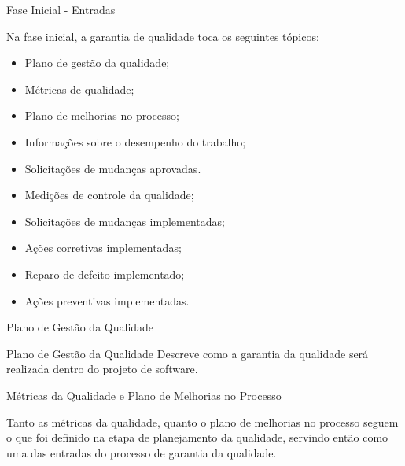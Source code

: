 \documentclass[xcolor=x11names,compress]{beamer}
\begin{document}
\begin{frame}[allowframebreaks]{Fase Inicial - Entradas}

Na fase inicial, a garantia de qualidade toca os seguintes tópicos:

\begin{itemize}
\itemsep 5mm

\item Plano de gestão da qualidade;

\item Métricas de qualidade;

\item Plano de melhorias no processo;

\item Informações sobre o desempenho do trabalho;

\item Solicitações de mudanças aprovadas.

\item Medições de controle da qualidade;

\item Solicitações de mudanças implementadas;

\item Ações corretivas implementadas;

\item Reparo de defeito implementado;

\item Ações preventivas implementadas.

\end{itemize}

\end{frame}

\begin{frame}{Plano de Gestão da Qualidade}

\begin{alertblock}{Plano de Gestão da Qualidade}
Descreve como a garantia da qualidade será realizada dentro do projeto de software.
\end{alertblock}

\end{frame}

\begin{frame}{Métricas da Qualidade e Plano de Melhorias no Processo}

Tanto as métricas da qualidade, quanto o plano de melhorias no processo seguem o que foi definido na etapa de planejamento da qualidade, servindo então como uma das entradas do processo de garantia da qualidade. 

\end{frame}
\end{document}
